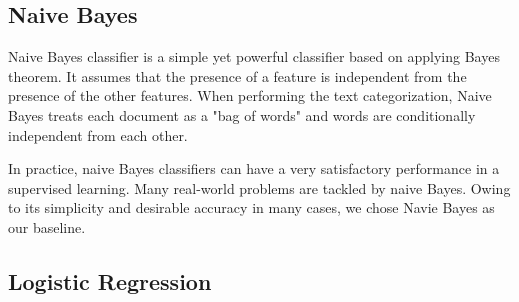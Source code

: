 
\subsection{Naive Bayes}
Naive Bayes \cite{NaiveBayes} classifier is a simple yet powerful classifier based on applying Bayes theorem. It assumes that the presence of a feature is independent from the presence of the other features. When performing the text categorization, Naive Bayes treats each document as a "bag of words" and words are conditionally independent from each other.

In practice, naive Bayes classifiers can have a very satisfactory performance in a supervised learning. Many real-world problems are tackled by naive Bayes. Owing to its simplicity and desirable accuracy in many cases, we chose Navie Bayes as our baseline.


\subsection{Logistic Regression}

